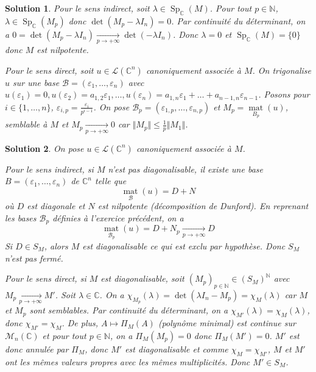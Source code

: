 \documentclass[12pt]{article}
\newtheorem{solution}{Solution}[section]
\theoremstyle{remark}
\newcommand{\C}{\mathbb{C}} \newcommand{\Q}{\mathbb{Q}}
\newcommand{\N}{\mathbb{N}} \newcommand{\Z}{\mathbb{Z}}
\newcommand{\M}{\mathcal{M}} \renewcommand{\L}{\mathcal{L}}
\DeclareMathOperator{\Sp}{Sp} \DeclareMathOperator{\mat}{mat}
\numberwithin{equation}{section}
\begin{document}
\begin{solution}
	Pour le sens indirect, soit $\lambda\in\Sp_{\C}(M)$. Pour tout $p\in\N$, $\lambda\in\Sp_{\C}(M_{p})$ donc $\det(M_{p}-\lambda I_{n})=0$. Par continuité du déterminant, on a $0=\det(M_{p}-\lambda I_{n})\xrightarrow[p\to+\infty]{}\det(-\lambda I_{n})$. Donc $\lambda=0$ et $\Sp_{\C}(M)=\{0\}$ donc $M$ est nilpotente.

	Pour le sens direct, soit $u\in\L(\C^{n})$ canoniquement associée à $M$. On trigonalise $u$ sur une base $\mathcal{B}=(\varepsilon_{1},\dots,\varepsilon_{n})$ avec $u(\varepsilon_{1})=0,u(\varepsilon_{2})=a_{1,2}\varepsilon_{1},\dots,u(\varepsilon_{n})=a_{1,n}\varepsilon_{1}+\dots+a_{n-1,n}\varepsilon_{n-1}$. Posons pour $i\in\{1,\dots,n\}$, $\varepsilon_{i,p}=\frac{\varepsilon_{i}}{p^{i-1}}$. On pose $\mathcal{B}_{p}=(\varepsilon_{1,p},\dots,\varepsilon_{n,p})$ et $M_{p}=\mat\limits_{B_{p}}(u)$, semblable à $M$ et $M_{p}\xrightarrow[p\to+\infty]{}0$ car $\Vert M_{p}\Vert\leqslant\frac{1}{p}\Vert M_{1}\Vert$.
\end{solution}

\begin{solution}
	On pose $u\in\L(\C^{n})$ canoniquement associée à $M$. 

	Pour le sens indirect, si $M$ n'est pas diagonalisable, il existe une base $B=(\varepsilon_{1},\dots,\varepsilon_{n})$ de $\C^{n}$ telle que 
	$$\mat\limits_{\mathcal{B}}(u)=D+N$$
	où $D$ est diagonale et $N$ est nilpotente (décomposition de Dunford). En reprenant les bases $\mathcal{B}_{p}$ définies à l'exercice précédent, on a
	$$\mat\limits_{\mathcal{B}_{p}}(u)=D+N_{p}\xrightarrow[p\to+\infty]{}D$$
	Si $D\in S_{M}$, alors $M$ est diagonalisable ce qui est exclu par hypothèse. Donc $S_{M}$ n'est pas fermé.

	Pour le sens direct, si $M$ est diagonalisable, soit $(M_{p})_{p\in\N}\in(S_{M})^{\N}$ avec $M_{p}\xrightarrow[p\to+\infty]{}M'$. Soit $\lambda\in\C$. On a $\chi_{M_{p}}(\lambda)=\det(\lambda I_{n}-M_{p})=\chi_{M}(\lambda)$ car $M$ et $M_{p}$ sont semblables. Par continuité du déterminant, on a $\chi_{M'}(\lambda)=\chi_{M}(\lambda)$, donc $\chi_{M'}=\chi_{M}$. De plus, $A\mapsto\Pi_{M}(A)$ (polynôme minimal) est continue sur $\M_{n}(\C)$ et pour tout $p\in\N$, on a $\Pi_{M}(M_{p})=0$ donc $\Pi_{M}(M')=0$. $M'$ est donc annulée par $\Pi_{M}$, donc $M'$ est diagonalisable et comme $\chi_{M}=\chi_{M'}$, $M$ et $M'$ ont les mêmes valeurs propres avec les mêmes multiplicités. Donc $M'\in S_{M}$.
\end{solution}
\end{document}
